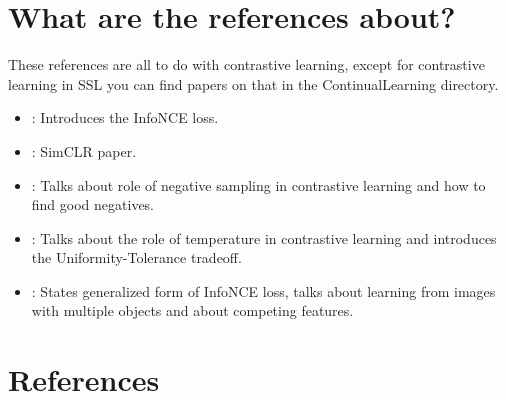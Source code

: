 \documentclass{article}
\author{by Henry Bourne}
\date{\today}
\newcommand{\setfoldernameastitle}{%
  \begingroup
  \edef\x{\endgroup\noexpand\title{\currfilebase}}\x
}
\begin{document}
\setfoldernameastitle %

\maketitle

\section{What are the references about?}
These references are all to do with contrastive learning, except for contrastive learning in SSL you can find papers on that in the ContinualLearning directory. 

\begin{itemize}
  \item \cite{oord2018representation}: Introduces the InfoNCE loss.
  \item \cite{chen2020simple}: SimCLR paper.
  \item \cite{xu2022negative}: Talks about role of negative sampling in contrastive learning and how to find good negatives.
  \item \cite{wang2021understanding}: Talks about the role of temperature in contrastive learning and introduces the Uniformity-Tolerance tradeoff.
  \item \cite{chen2021intriguing}: States generalized form of InfoNCE loss, talks about learning from images with multiple objects and about competing features.
\end{itemize}

\section{References}
\end{document}
